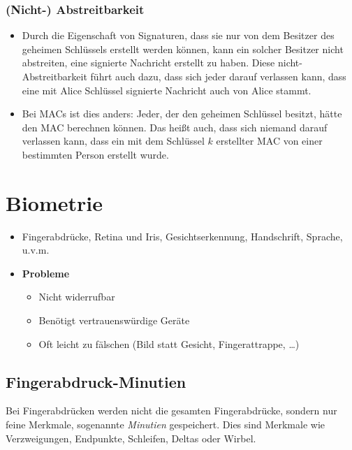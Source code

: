 \documentclass[a4paper, 11pt, accentcolor = tud3b]{tudreport}
\begin{document}
	            \subsubsection{(Nicht-) Abstreitbarkeit}
		            \begin{itemize}
		            	\item Durch die Eigenschaft von Signaturen, dass sie nur von dem Besitzer des geheimen Schlüssels erstellt werden können, kann ein solcher Besitzer nicht abstreiten, eine signierte Nachricht erstellt zu haben. Diese nicht-Abstreitbarkeit führt auch dazu, dass sich jeder darauf verlassen kann, dass eine mit Alice Schlüssel signierte Nachricht auch von Alice stammt.
		            	\item Bei MACs ist dies anders: Jeder, der den geheimen Schlüssel besitzt, hätte den MAC berechnen können. Das heißt auch, dass sich niemand darauf verlassen kann, dass ein mit dem Schlüssel \(k\) erstellter MAC von einer bestimmten Person erstellt wurde.
		            \end{itemize}

        \section{Biometrie}
            \begin{itemize}
            	\item Fingerabdrücke, Retina und Iris, Gesichtserkennung, Handschrift, Sprache, u.v.m.
            	\item \textbf{Probleme}
	            	\begin{itemize}
	            		\item Nicht widerrufbar
	            		\item Benötigt vertrauenswürdige Geräte
	            		\item Oft leicht zu fälschen (Bild statt Gesicht, Fingerattrappe, \dots)
	            	\end{itemize}
            \end{itemize}

            \subsection{Fingerabdruck-Minutien}
                Bei Fingerabdrücken werden nicht die gesamten Fingerabdrücke, sondern nur feine Merkmale, sogenannte \textit{Minutien} gespeichert. Dies sind Merkmale wie Verzweigungen, Endpunkte, Schleifen, Deltas oder Wirbel.
\end{document}
